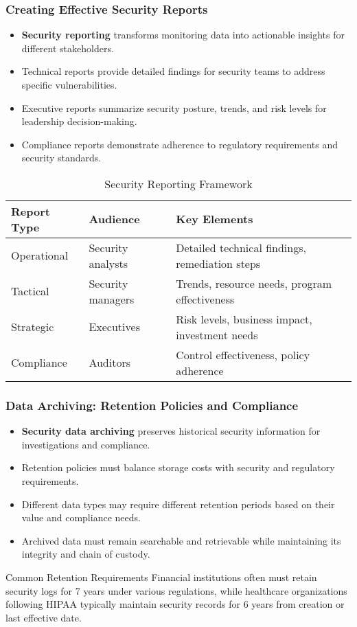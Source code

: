 \documentclass{beamer}
\begin{document}
\begin{frame}
\frametitle{Creating Effective Security Reports}
\begin{itemize}
\item \textbf{Security reporting} transforms monitoring data into actionable insights for different stakeholders.
\item Technical reports provide detailed findings for security teams to address specific vulnerabilities.
\item Executive reports summarize security posture, trends, and risk levels for leadership decision-making.
\item Compliance reports demonstrate adherence to regulatory requirements and security standards.
\end{itemize}

\begin{table}
\scriptsize
\begin{tabular}{lll}
\toprule
\textbf{Report Type} & \textbf{Audience} & \textbf{Key Elements} \\
\midrule
Operational & Security analysts & Detailed technical findings, remediation steps \\
Tactical & Security managers & Trends, resource needs, program effectiveness \\
Strategic & Executives & Risk levels, business impact, investment needs \\
Compliance & Auditors & Control effectiveness, policy adherence \\
\bottomrule
\end{tabular}
\caption{Security Reporting Framework}
\end{table}
\end{frame}

\begin{frame}
\frametitle{Data Archiving: Retention Policies and Compliance}
\begin{itemize}
\item \textbf{Security data archiving} preserves historical security information for investigations and compliance.
\item Retention policies must balance storage costs with security and regulatory requirements.
\item Different data types may require different retention periods based on their value and compliance needs.
\item Archived data must remain searchable and retrievable while maintaining its integrity and chain of custody.
\end{itemize}

\begin{exampleblock}{Common Retention Requirements}
\scriptsize
Financial institutions often must retain security logs for 7 years under various regulations, while healthcare organizations following HIPAA typically maintain security records for 6 years from creation or last effective date.
\end{exampleblock}
\end{frame}
\end{document}

